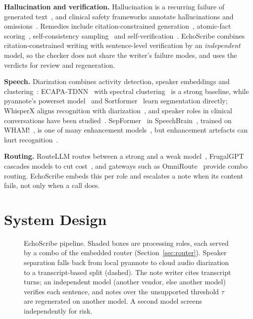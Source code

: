 \documentclass[conference]{IEEEtran}
\begin{document}
\textbf{Hallucination and verification.} Hallucination is a recurring failure of generated text~\cite{ji2023survey}, and clinical safety frameworks annotate hallucinations and omissions~\cite{asgari2025}. Remedies include citation-constrained generation~\cite{gao2023alce}, atomic-fact scoring~\cite{min2023factscore}, self-consistency sampling~\cite{manakul2023selfcheck} and self-verification~\cite{dhuliawala2024cove}. EchoScribe combines citation-constrained writing with sentence-level verification by an \emph{independent} model, so the checker does not share the writer's failure modes, and uses the verdicts for review and regeneration.

\textbf{Speech.} Diarization combines activity detection, speaker embeddings and clustering~\cite{park2022review}: ECAPA-TDNN~\cite{desplanques2020ecapa} with spectral clustering~\cite{vonluxburg2007} is a strong baseline, while pyannote's powerset model~\cite{plaquet2023powerset} and Sortformer~\cite{park2025sortformer} learn segmentation directly; WhisperX aligns recognition with diarization~\cite{bain2023whisperx}, and speaker roles in clinical conversations have been studied~\cite{zolensky2025}. SepFormer~\cite{subakan2021sepformer} in SpeechBrain~\cite{ravanelli2021speechbrain}, trained on WHAM!~\cite{wichern2019wham}, is one of many enhancement models~\cite{dubey2024dns}, but enhancement artefacts can hurt recognition~\cite{iwamoto2022}.

\textbf{Routing.} RouteLLM routes between a strong and a weak model~\cite{ong2024routellm}, FrugalGPT cascades models to cut cost~\cite{chen2024frugalgpt}, and gateways such as OmniRoute~\cite{omniroute2026} provide combo routing. EchoScribe embeds this per role and escalates a note when its content fails, not only when a call does.

\section{System Design}
\begin{figure}[t]
\centering

\caption{EchoScribe pipeline. Shaded boxes are processing roles, each served by a combo of the embedded router (Section~\ref{sec:router}). Speaker separation falls back from local pyannote to cloud audio diarization to a transcript-based split (dashed). The note writer cites transcript turns; an independent model (another vendor, else another model) verifies each sentence, and notes over the unsupported threshold $\tau$ are regenerated on another model. A second model screens independently for risk.}
\label{fig:pipeline}
\end{figure}
\end{document}
